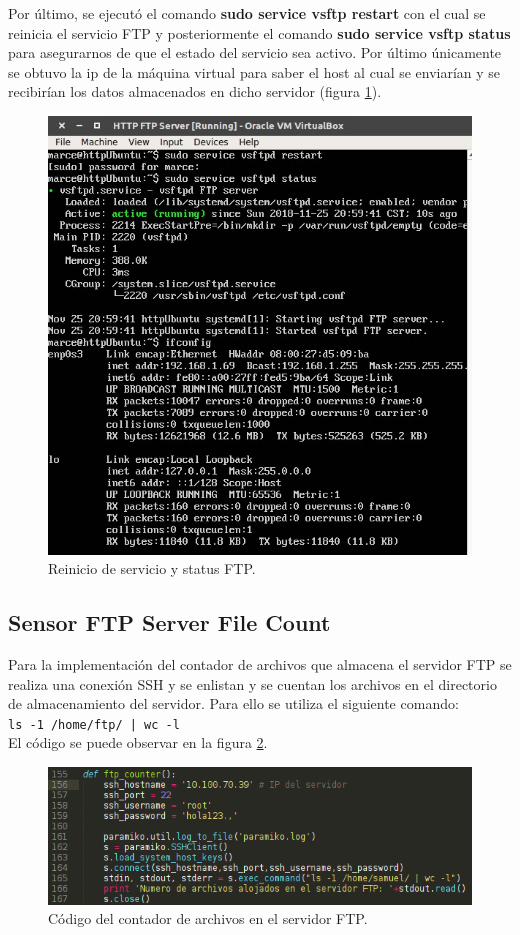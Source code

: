 Por último, se ejecutó el comando \textbf{sudo service vsftp restart} con el cual se reinicia el servicio FTP y posteriormente el comando \textbf{sudo service vsftp status} para asegurarnos de que el estado del servicio sea activo. Por último únicamente se obtuvo la ip de la máquina virtual para saber el host al cual se enviarían y se recibirían los datos almacenados en dicho servidor (figura \ref{image:ftp3}).

\FloatBarrier
\begin{figure}[htbp!]
		\centering
			\includegraphics[width=.75 \textwidth]{images/ftp3}
		\caption{Reinicio de servicio y status FTP.}
		\label{image:ftp3}
\end{figure}
\FloatBarrier
\subsection{Sensor FTP Server File Count}

Para la implementación del contador de archivos que almacena el servidor FTP se realiza una conexión SSH y se enlistan y se cuentan los archivos en el directorio de almacenamiento del servidor. Para ello se utiliza el siguiente comando:\\
\texttt{ls -1 /home/ftp/ | wc -l}\\

El código se puede observar en la figura \ref{image:ftpcounter}.

\FloatBarrier
\begin{figure}[htbp!]
		\centering
			\includegraphics[width=.75 \textwidth]{images/ftpcounter}
		\caption{Código del contador de archivos en el servidor FTP.}
		\label{image:ftpcounter}
\end{figure}
\FloatBarrier

